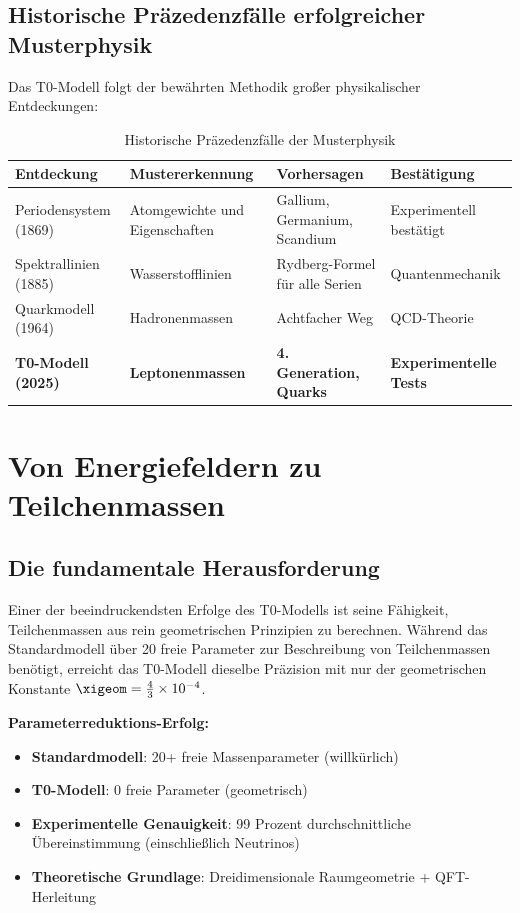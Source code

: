 \subsection{Historische Präzedenzfälle erfolgreicher Musterphysik}
\label{subsec:historical_precedence}

Das T0-Modell folgt der bewährten Methodik großer physikalischer Entdeckungen:

\begin{table}[H]
	\centering
	\begin{tabular}{p{3cm}p{4cm}p{4cm}p{3cm}}
		\toprule
		\textbf{Entdeckung} & \textbf{Mustererkennung} & \textbf{Vorhersagen} & \textbf{Bestätigung} \\
		\midrule
		Periodensystem (1869) & Atomgewichte und Eigenschaften & Gallium, Germanium, Scandium & Experimentell bestätigt \\
		Spektrallinien (1885) & Wasserstofflinien & Rydberg-Formel für alle Serien & Quantenmechanik \\
		Quarkmodell (1964) & Hadronenmassen & Achtfacher Weg & QCD-Theorie \\
		\textbf{T0-Modell (2025)} & \textbf{Leptonenmassen} & \textbf{4. Generation, Quarks} & \textbf{Experimentelle Tests} \\
		\bottomrule
	\end{tabular}
	\caption{Historische Präzedenzfälle der Musterphysik}
	\label{tab:historical_precedence}
\end{table}

\section{Von Energiefeldern zu Teilchenmassen}
\label{sec:energy_fields_to_masses}

\subsection{Die fundamentale Herausforderung}
\label{subsec:fundamental_challenge}

Einer der beeindruckendsten Erfolge des T0-Modells ist seine Fähigkeit, Teilchenmassen aus rein geometrischen Prinzipien zu berechnen. Während das Standardmodell über 20 freie Parameter zur Beschreibung von Teilchenmassen benötigt, erreicht das T0-Modell dieselbe Präzision mit nur der geometrischen Konstante $\xigeom = \frac{4}{3} \times 10^{-4}$.

\begin{tcolorbox}[colback=green!5!white,colframe=green!75!black,title=Massen-Revolution]
	\textbf{Parameterreduktions-Erfolg:}
	\begin{itemize}
		\item \textbf{Standardmodell}: 20+ freie Massenparameter (willkürlich)
		\item \textbf{T0-Modell}: 0 freie Parameter (geometrisch)
		\item \textbf{Experimentelle Genauigkeit}: 99 Prozent durchschnittliche Übereinstimmung (einschließlich Neutrinos)
		\item \textbf{Theoretische Grundlage}: Dreidimensionale Raumgeometrie + QFT-Herleitung
	\end{itemize}
\end{tcolorbox}

